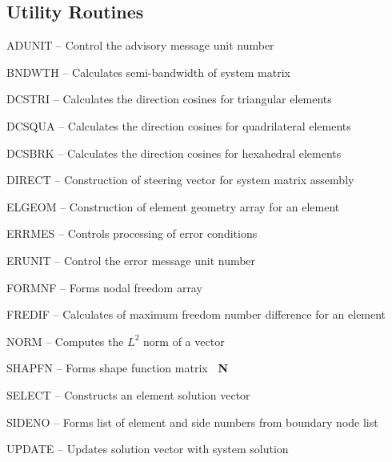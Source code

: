 \subsection*{Utility Routines}      %
\begin{list}{}{\leftmargin=57pt }
\item[ADUNIT \hfill] -- Control the advisory message unit number
\item[BNDWTH \hfill] -- Calculates semi-bandwidth of system matrix
\item[DCSTRI \hfill] -- Calculates the direction cosines for triangular elements
\item[DCSQUA \hfill] -- Calculates the direction cosines for quadrilateral elements
\item[DCSBRK \hfill] -- Calculates the direction cosines for hexahedral elements
\item[DIRECT \hfill] -- Construction of steering vector for system matrix assembly
\item[ELGEOM \hfill] -- Construction of element geometry array for an element
\item[ERRMES \hfill] -- Controls processing of error conditions
\item[ERUNIT \hfill] -- Control the error message unit number
\item[FORMNF \hfill] -- Forms nodal freedom array
\item[FREDIF \hfill] -- Calculates of maximum freedom number difference for an element
\item[NORM \hfill]   -- Computes the $L^2$ norm of a vector
\item[SHAPFN \hfill] -- Forms shape function matrix {\bf~N}
\item[SELECT \hfill] -- Constructs an element solution vector
\item[SIDENO \hfill] -- Forms list of element and side numbers from boundary node list
\item[UPDATE \hfill] -- Updates solution vector with system solution
\end{list}
